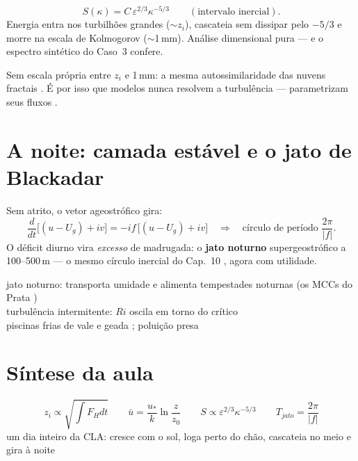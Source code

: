 \documentclass[11pt]{article}
\begin{document}
\begin{formalivro}
\[ S(\kappa) = C\,\varepsilon^{2/3}\kappa^{-5/3}
\qquad(\text{intervalo inercial}). \]
Energia entra nos turbilhões grandes ($\sim z_i$), cascateia sem
dissipar pelo $-5/3$ e morre na escala de Kolmogorov ($\sim$1\,mm).
Análise dimensional pura — e o espectro sintético do Caso~3 confere.
\end{formalivro}

Sem escala própria entre $z_i$ e 1\,mm: a mesma autossimilaridade das
nuvens fractais . É por isso que modelos nunca
resolvem a turbulência — parametrizam seus fluxos
.

\section{A noite: camada estável e o jato de Blackadar}
\label{sec:noturna}


\begin{formadif}
Sem atrito, o vetor ageostrófico gira:
\[ \frac{d}{dt}\bigl[(u - U_g) + iv\bigr] = -if\,\bigl[(u-U_g)+iv\bigr]
\quad\Rightarrow\quad \text{círculo de período } \frac{2\pi}{|f|}. \]
O déficit diurno vira \emph{excesso} de madrugada: o \textbf{jato
noturno} supergeostrófico a 100--500\,m — o mesmo círculo inercial do
Cap.~10 , agora com utilidade.
\end{formadif}

\begin{noquadro}
jato noturno: transporta umidade e alimenta tempestades noturnas (os
MCCs do Prata )\\
turbulência intermitente: $Ri$ oscila em torno do crítico
\\
piscinas frias de vale e geada ; poluição
presa 
\end{noquadro}

\section{Síntese da aula}

\begin{noquadro}
\[ z_i \propto \sqrt{\textstyle\int F_H dt} \qquad
\bar u = \frac{u_*}{k}\ln\frac{z}{z_0} \qquad
S \propto \varepsilon^{2/3}\kappa^{-5/3} \qquad
T_{jato} = \frac{2\pi}{|f|} \]
um dia inteiro da CLA: cresce com o sol, loga perto do chão,
cascateia no meio e gira à noite
\end{noquadro}
\end{document}
